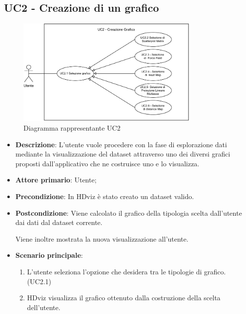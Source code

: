 \newpage

\subsection{UC2 - Creazione di un grafico}
\label{subsec:uc2}

\begin{figure}[h]
    \centering
    \includegraphics[width=0.8\textwidth]{componenti/casi-duso/diagrammi/UC2.pdf}
    \caption{Diagramma rappresentante UC2}
    \label{fig:UC2}
\end{figure}


\begin{itemize}
    \item \textbf{Descrizione}: L’utente vuole procedere con la fase di esplorazione
                                dati mediante la visualizzazione del dataset
                                attraverso uno dei diversi grafici proposti dall’applicativo
                                che ne costruisce uno e lo visualizza.
	
    \item \textbf{Attore primario}: Utente;
    
    \item \textbf{Precondizione}:   In HDviz è stato creato un dataset valido.

    \item \textbf{Postcondizione}:  Viene calcolato il grafico della tipologia scelta dall'utente dai dati 
									dal dataset corrente. 
									
									Viene inoltre mostrata la nuova visualizzazione all'utente.

	\item \textbf{Scenario principale}:
		\begin{enumerate}
			\item L'utente seleziona l'opzione che desidera tra le tipologie di grafico. (UC2.1)
			\item HDviz visualizza il grafico ottenuto dalla costruzione della scelta dell'utente.
		\end{enumerate}
\end{itemize}

